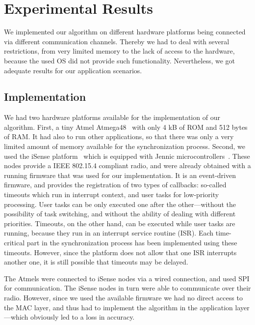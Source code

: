 \section{Experimental Results}
\label{sec:exp_results}

We implemented our algorithm on different hardware platforms being
connected via different communication channels. Thereby we had to deal
with several restrictions, from very limited memory to the lack of
access to the hardware, because the used OS did not provide such
functionality. Nevertheless, we got adequate results for our
application scenarios.

\subsection{Implementation}

We had two hardware platforms available for the implementation of our
algorithm. First, a tiny Atmel Atmega48~\cite{atmega48} with only 4 kB
of ROM and 512 bytes of RAM. It had also to run other applications, so
that there was only a very limited amount of memory available for the
synchronization process. Second, we used the iSense
platform~\cite{buschmann07isense} which is equipped with Jennic
microcontrollers~\cite{jennic}. These nodes provide a IEEE 802.15.4
compliant radio, and were already obtained with a running firmware
that was used for our implementation. It is an event-driven firmware,
and provides the registration of two types of callbacks: so-called
timeouts which run in interrupt context, and user tasks for
low-priority processing. User tasks can be only executed one after the
other---without the possibility of task switching, and without the
ability of dealing with different priorities. Timeouts, on the other
hand, can be executed while user tasks are running, because they run
in an interrupt service routine (ISR). Each time-critical part in the
synchronization process has been implemented using these
timeouts. However, since the platform does not allow that one ISR
interrupts another one, it is still possible that timeouts may be
delayed.

The Atmels were connected to iSense nodes via a wired connection, and
used SPI for communication. The iSense nodes in turn were able to
communicate over their radio. However, since we used the available
firmware we had no direct access to the MAC layer, and thus had to
implement the algorithm in the application layer---which obviously led
to a loss in accuracy.

